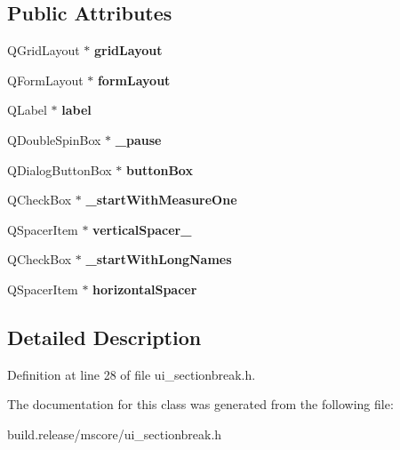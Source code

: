\subsection*{Public Attributes}
\begin{DoxyCompactItemize}
\item 
\mbox{\label{class_ui___section_break_properties_a0114b5f431e62833ff5e6d2c5dafe975}} 
Q\+Grid\+Layout $\ast$ {\bfseries grid\+Layout}
\item 
\mbox{\label{class_ui___section_break_properties_ab8ab7c98e1ea16946994638a83610a91}} 
Q\+Form\+Layout $\ast$ {\bfseries form\+Layout}
\item 
\mbox{\label{class_ui___section_break_properties_a876e7b037b8d5345a6981e80055dbf47}} 
Q\+Label $\ast$ {\bfseries label}
\item 
\mbox{\label{class_ui___section_break_properties_aafa089b43c90eb9e10afec502f7c2537}} 
Q\+Double\+Spin\+Box $\ast$ {\bfseries \+\_\+pause}
\item 
\mbox{\label{class_ui___section_break_properties_ae728ed077212a69e6604e33b0f750052}} 
Q\+Dialog\+Button\+Box $\ast$ {\bfseries button\+Box}
\item 
\mbox{\label{class_ui___section_break_properties_ac3727bc52797ed52ddcab935cbe7e455}} 
Q\+Check\+Box $\ast$ {\bfseries \+\_\+start\+With\+Measure\+One}
\item 
\mbox{\label{class_ui___section_break_properties_a1ed907e97f5573a533a0830496fd57a3}} 
Q\+Spacer\+Item $\ast$ {\bfseries vertical\+Spacer\+\_}
\item 
\mbox{\label{class_ui___section_break_properties_a64eebc97103fb4206c6202b3c6201eff}} 
Q\+Check\+Box $\ast$ {\bfseries \+\_\+start\+With\+Long\+Names}
\item 
\mbox{\label{class_ui___section_break_properties_a445161147ae2c76adb0d1e9508965abd}} 
Q\+Spacer\+Item $\ast$ {\bfseries horizontal\+Spacer}
\end{DoxyCompactItemize}


\subsection{Detailed Description}


Definition at line 28 of file ui\+\_\+sectionbreak.\+h.



The documentation for this class was generated from the following file\+:\begin{DoxyCompactItemize}
\item 
build.\+release/mscore/ui\+\_\+sectionbreak.\+h\end{DoxyCompactItemize}
